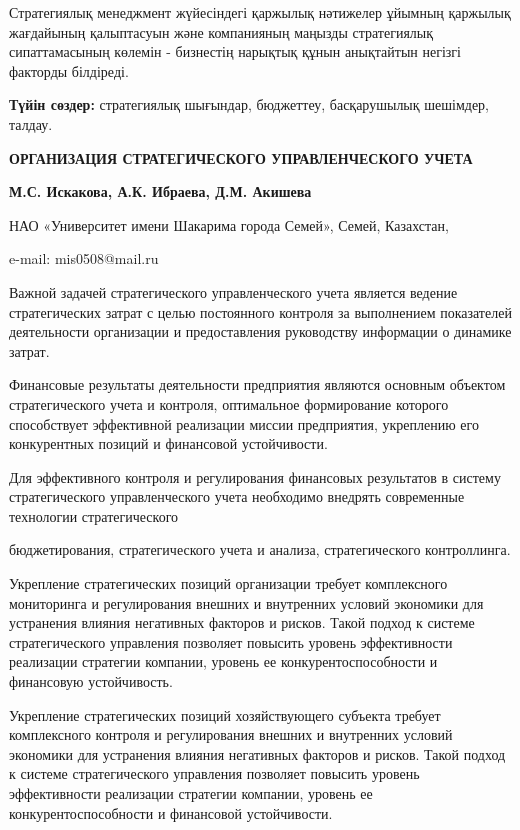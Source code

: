 Стратегиялық менеджмент жүйесіндегі қаржылық нәтижелер ұйымның қаржылық
жағдайының қалыптасуын және компанияның маңызды стратегиялық
сипаттамасының көлемін - бизнестің нарықтық құнын анықтайтын негізгі
факторды білдіреді.

{\bfseries Түйін сөздер:} стратегиялық шығындар, бюджеттеу, басқарушылық
шешімдер, талдау.

\begin{articleheader}
{\bfseries ОРГАНИЗАЦИЯ СТРАТЕГИЧЕСКОГО УПРАВЛЕНЧЕСКОГО УЧЕТА}

{\bfseries
М.С. Искакова\textsuperscript{\envelope },
А.К. Ибраева,
Д.М. Акишева
}
\end{articleheader}

\begin{articleheader}
НАО «Университет имени Шакарима города Семей», Семей, Казахстан,

e-mail: mis0508@mail.ru
\end{articleheader}

\vspace{-1em}
Важной задачей стратегического управленческого учета является ведение
стратегических затрат с целью постоянного контроля за выполнением
показателей деятельности организации и предоставления руководству
информации о динамике затрат.

Финансовые результаты деятельности предприятия являются основным
объектом стратегического учета и контроля, оптимальное формирование
которого способствует эффективной реализации миссии предприятия,
укреплению его конкурентных позиций и финансовой устойчивости.

Для эффективного контроля и регулирования финансовых результатов в
систему стратегического управленческого учета необходимо внедрять
современные технологии стратегического 

бюджетирования, стратегического
учета и анализа, стратегического контроллинга.

Укрепление стратегических позиций организации требует комплексного
мониторинга и регулирования внешних и внутренних условий экономики для
устранения влияния негативных факторов и рисков. Такой подход к системе
стратегического управления позволяет повысить уровень эффективности
реализации стратегии компании, уровень ее конкурентоспособности и
финансовую устойчивость.

Укрепление стратегических позиций хозяйствующего субъекта требует
комплексного контроля и регулирования внешних и внутренних условий
экономики для устранения влияния негативных факторов и рисков. Такой
подход к системе стратегического управления позволяет повысить уровень
эффективности реализации стратегии компании, уровень ее
конкурентоспособности и финансовой устойчивости.


